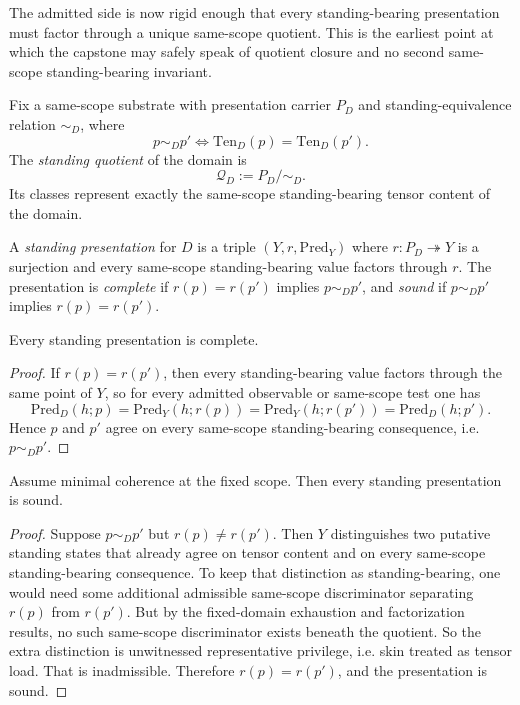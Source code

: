 The admitted side is now rigid enough that every standing-bearing presentation must factor through a unique same-scope quotient. This is the earliest point at which the capstone may safely speak of quotient closure and no second same-scope standing-bearing invariant.

\begin{definition}
Fix a same-scope substrate with presentation carrier $P_D$ and standing-equivalence relation $\sim_D$, where
\[
p \sim_D p' \iff \mathrm{Ten}_D(p)=\mathrm{Ten}_D(p').
\]
The \emph{standing quotient} of the domain is
\[
\mathcal Q_D := P_D/\!\sim_D.
\]
Its classes represent exactly the same-scope standing-bearing tensor content of the domain.
\end{definition}

\begin{definition}
A \emph{standing presentation} for $D$ is a triple $(Y,r,\mathrm{Pred}_Y)$ where $r:P_D\twoheadrightarrow Y$ is a surjection and every same-scope standing-bearing value factors through $r$. The presentation is \emph{complete} if $r(p)=r(p')$ implies $p\sim_D p'$, and \emph{sound} if $p\sim_D p'$ implies $r(p)=r(p')$.
\end{definition}

\begin{lemma}
\label{lem:completeness-standing-presentation}
Every standing presentation is complete.
\end{lemma}

\begin{proof}
If $r(p)=r(p')$, then every standing-bearing value factors through the same point of $Y$, so for every admitted observable or same-scope test one has
\[
\mathrm{Pred}_D(h;p)=\mathrm{Pred}_Y(h;r(p))=\mathrm{Pred}_Y(h;r(p'))=\mathrm{Pred}_D(h;p').
\]
Hence $p$ and $p'$ agree on every same-scope standing-bearing consequence, i.e. $p\sim_D p'$.\cite{MaleyATS}
\end{proof}

\begin{lemma}
\label{lem:soundness-standing-presentation}
Assume minimal coherence at the fixed scope. Then every standing presentation is sound.
\end{lemma}

\begin{proof}
Suppose $p\sim_D p'$ but $r(p)\neq r(p')$. Then $Y$ distinguishes two putative standing states that already agree on tensor content and on every same-scope standing-bearing consequence. To keep that distinction as standing-bearing, one would need some additional admissible same-scope discriminator separating $r(p)$ from $r(p')$. But by the fixed-domain exhaustion and factorization results, no such same-scope discriminator exists beneath the quotient. So the extra distinction is unwitnessed representative privilege, i.e. skin treated as tensor load. That is inadmissible. Therefore $r(p)=r(p')$, and the presentation is sound.\cite{MaleyATS,MaleyExhaustion}
\end{proof}

